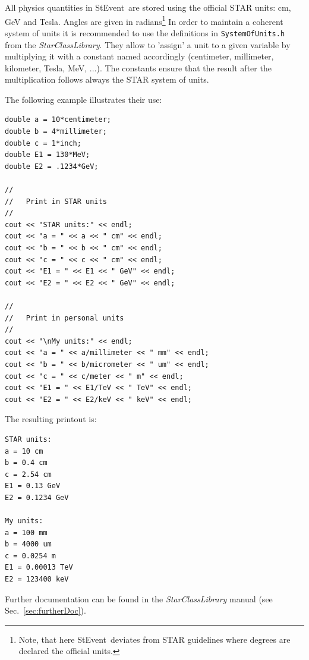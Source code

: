 \documentclass[twoside]{article}
\newcommand{\name}[1]{\textsl{#1}}%
\newcommand{\StEvent}{\textsf{StEvent}}
\begin{document}
All physics quantities in \StEvent\ are stored using the official STAR
units: cm, GeV and Tesla.  Angles are given in radians\footnote{Note,
    that here \StEvent\ deviates from STAR guidelines where degrees
    are declared the official units.}  In order to maintain a coherent
system of units it is recommended to use the definitions in
\texttt{SystemOfUnits.h} from the \name{StarClassLibrary}. They allow
to 'assign' a unit to a given variable by multiplying it with a
constant named accordingly (centimeter, millimeter, kilometer, Tesla,
MeV, ...).  The constants ensure that the result after the
multiplication follows always the STAR system of units.

The following example illustrates their use:
\begin{verbatim}
double a = 10*centimeter;
double b = 4*millimeter;
double c = 1*inch;
double E1 = 130*MeV;
double E2 = .1234*GeV;

//
//   Print in STAR units
//
cout << "STAR units:" << endl;
cout << "a = " << a << " cm" << endl;
cout << "b = " << b << " cm" << endl;
cout << "c = " << c << " cm" << endl;
cout << "E1 = " << E1 << " GeV" << endl;
cout << "E2 = " << E2 << " GeV" << endl;

//
//   Print in personal units
//
cout << "\nMy units:" << endl;
cout << "a = " << a/millimeter << " mm" << endl;
cout << "b = " << b/micrometer << " um" << endl;
cout << "c = " << c/meter << " m" << endl;
cout << "E1 = " << E1/TeV << " TeV" << endl;
cout << "E2 = " << E2/keV << " keV" << endl;
\end{verbatim}
The resulting printout is:
\begin{verbatim}
STAR units:
a = 10 cm
b = 0.4 cm
c = 2.54 cm
E1 = 0.13 GeV
E2 = 0.1234 GeV

My units:
a = 100 mm
b = 4000 um
c = 0.0254 m
E1 = 0.00013 TeV
E2 = 123400 keV
\end{verbatim}
Further documentation can be found in the \name{StarClassLibrary}
manual (see Sec.~\ref{sec:furtherDoc}).\vfill
\end{document}
